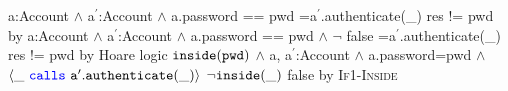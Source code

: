 {
	\begin{proofexample}
			{\proofstepwithrule
				{\hoareEx
						{a:Account $\wedge$ a$^\prime$:Account $\wedge$ a.password == pwd}
						{=a$^\prime$.authenticate(\_)}
						{res != pwd}
						}
					{by \funcSpec}
			}
			{\proofstepwithrule
				{\hoareEx
						{a:Account $\wedge$ a$^\prime$:Account $\wedge$ a.password == pwd $\wedge$ $\neg$ false}
						{=a$^\prime$.authenticate(\_)}
						{res != pwd}
						}
					{by Hoare logic}
			}
			{\proofstepwithrule
				{\onlyIfSingleExAlt
						{$\texttt{inside}( {\texttt{pwd}} )$ $\wedge$ a, a$^\prime$:Account $\wedge$ a.password=pwd $\wedge$ $\langle \_\ {\color{blue}\texttt{calls}}\ {\texttt{a}}^\prime.{\texttt{authenticate}}(\_) \rangle$}
						{$\neg \texttt{inside}( \_ )$}
						{false}
						}
					{by \textsc{If1-Inside}}
			}
		\endproofsteps
	\end{proofexample}
	}
